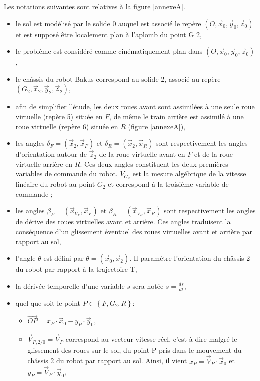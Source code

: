 Les notations suivantes sont relatives à la figure \ref{annexeA}.
\begin{itemize}
 \item le sol est modélisé par le solide $0$ auquel est associé le repère $(O,\vec{x}_0,\vec{y}_0,\vec{z}_0)$ et est supposé être localement plan à l'aplomb du point G 2,
 \item le problème est considéré comme cinématiquement plan dans $(O,\vec{x}_0,\vec{y}_0,\vec{z}_0)$,
 \item le châssis du robot Bakus correspond au solide 2, associé au repère $(G_2,\vec{x}_2,\vec{y}_2,\vec{z}_2)$,
 \item afin de simplifier l'étude, les deux roues avant sont assimilées à une seule roue virtuelle (repère 5) située en $F$, de même le train arrière est assimilé à une roue virtuelle (repère 6) située en $R$ (figure \ref{annexeA}),
 \item les angles $\delta_F=(\vec{x}_2,\vec{x}_F)$ et $\delta_R=(\vec{x}_2,\vec{x}_R)$ sont respectivement les angles d'orientation autour de $\vec{z}_2$ de la roue virtuelle avant en $F$ et de la roue virtuelle arrière en $R$. Ces deux angles constituent les deux premières variables de commande du robot. $V_{G_2}$ est la mesure algébrique de la vitesse linéaire du robot au point $G_2$ et correspond à la troisième variable de commande ;
 \item les angles $\beta_F=(\vec{x}_{V_F},\vec{x}_F)$ et $\beta_R=(\vec{x}_{V_R},\vec{x}_R)$ sont respectivement les angles de dérive des roues virtuelles avant et arrière. Ces angles traduisent la conséquence d'un glissement éventuel des roues virtuelles avant et arrière par rapport au sol,
 \item l'angle $\theta$ est défini par $\theta=(\vec{x}_0,\vec{x}_2)$. Il paramètre l'orientation du châssis 2 du robot par rapport à la
trajectoire T,
 \item la dérivée temporelle d'une variable $s$ sera notée $\dot{s}=\frac{ds}{dt}$,
 \item quel que soit le point $P\in\left\{F,G_2,R\right\}$:
 \begin{itemize}
  \item $\overrightarrow{OP}=x_P\cdot\vec{x}_0-y_P\cdot\vec{y}_0$,
  \item $\vec{V}_{P,2/0}=\vec{V}_P$ correspond au vecteur vitesse réel, c'est-à-dire malgré le glissement des roues sur le sol, du point P pris dans le mouvement du châssis 2 du robot par rapport au sol. Ainsi, il vient $\dot{x}_P=\vec{V}_P\cdot\vec{x}_0$ et $\dot{y}_P=\vec{V}_P\cdot\vec{y}_0$,

\end{itemize}
\end{itemize}
